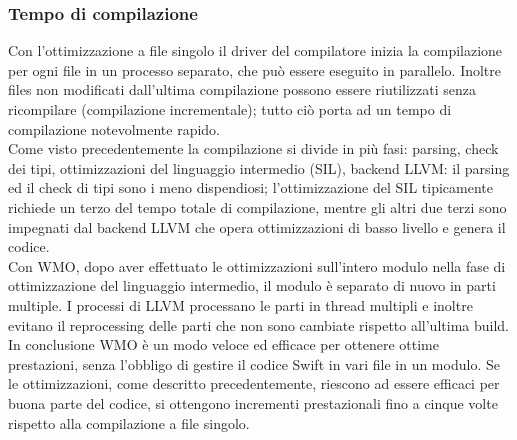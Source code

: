 \subsubsection{Tempo di compilazione}
Con l'ottimizzazione a file singolo il driver del compilatore inizia la compilazione per ogni file in un processo separato, che può essere eseguito in parallelo. Inoltre files non modificati dall'ultima compilazione possono essere riutilizzati senza ricompilare (compilazione incrementale); tutto ciò porta ad un tempo di compilazione notevolmente rapido.\\
Come visto precedentemente la compilazione si divide in più fasi: parsing, check dei tipi, ottimizzazioni del linguaggio intermedio (SIL), backend LLVM: il parsing ed il check di tipi sono i meno dispendiosi; l'ottimizzazione del SIL tipicamente richiede un terzo del tempo totale di compilazione, mentre gli altri due terzi sono impegnati dal backend LLVM che opera ottimizzazioni di basso livello e genera il codice.\\
Con WMO, dopo aver effettuato le ottimizzazioni sull'intero modulo nella fase di ottimizzazione del linguaggio intermedio, il modulo è separato di nuovo in parti multiple. I processi di LLVM processano le parti in thread multipli e inoltre evitano il reprocessing delle parti che non sono cambiate rispetto all'ultima build.
In conclusione WMO è un modo veloce ed efficace per ottenere ottime prestazioni, senza l'obbligo di gestire il codice Swift in vari file in un modulo. Se le ottimizzazioni, come descritto precedentemente, riescono ad essere efficaci per buona parte del codice, si ottengono incrementi prestazionali fino a cinque volte rispetto alla compilazione a file singolo. 
